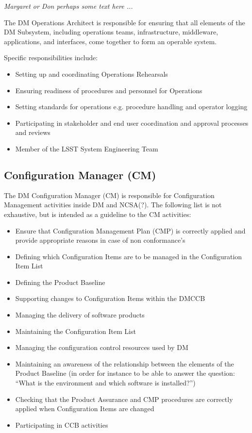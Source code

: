 \textit{Margaret or Don perhaps some text here ...}

The DM Operations Architect is responsible for ensuring that all elements of the DM Subsystem, including operations teams, infrastructure, middleware, applications, and interfaces,
come together to form an operable system.

Specific responsibilities include:

\begin{itemize}
\item Setting up and coordinating Operations Rehearsals
\item Ensuring readiness of procedures and personnel for Operations
\item Setting standards for operations e.g. procedure handling and operator logging
\item Participating in stakeholder and end user coordination and approval processes and reviews
\item Member of the LSST System Engineering Team
\end{itemize}

\subsection{Configuration Manager (CM)}\label{role:cm}

The DM Configuration Manager (CM) is responsible for Configuration Management activities inside DM and NCSA(?).
The following list is not exhaustive, but is intended as a guideline to the CM activities:

\begin{itemize}
\item Ensure that Configuration Management Plan (CMP) is correctly applied and provide appropriate reasons in case of non conformance's
\item Defining which Configuration Items are to be managed in the Configuration Item List
\item Defining the Product Baseline
\item Supporting changes to Configuration Items within the DMCCB
\item Managing the delivery of software products
\item Maintaining the Configuration Item List
\item Managing the configuration control resources used by DM
\item Maintaining an awareness of the relationship between  the elements of the Product Baseline (in order for instance to be able to answer the question: ``What is the environment and which software is installed?'')
 \item Checking that the Product Assurance and CMP procedures are correctly applied when Configuration Items are changed
 \item Participating in CCB activities
\end{itemize}

